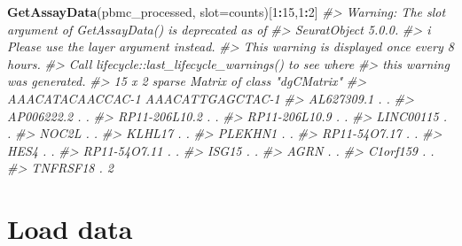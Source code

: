 \documentclass[
]{book}
\newenvironment{Shaded}{\begin{snugshade}}{\end{snugshade}}
\newcommand{\AttributeTok}[1]{\textcolor[rgb]{0.13,0.29,0.53}{#1}}
\newcommand{\CommentTok}[1]{\textcolor[rgb]{0.56,0.35,0.01}{\textit{#1}}}
\newcommand{\DecValTok}[1]{\textcolor[rgb]{0.00,0.00,0.81}{#1}}
\newcommand{\FunctionTok}[1]{\textcolor[rgb]{0.13,0.29,0.53}{\textbf{#1}}}
\newcommand{\NormalTok}[1]{#1}
\newcommand{\SpecialCharTok}[1]{\textcolor[rgb]{0.81,0.36,0.00}{\textbf{#1}}}
\newcommand{\StringTok}[1]{\textcolor[rgb]{0.31,0.60,0.02}{#1}}
\begin{document}
\begin{Shaded}
\begin{Highlighting}[]
\FunctionTok{GetAssayData}\NormalTok{(pbmc\_processed, }\AttributeTok{slot=}\StringTok{\textquotesingle{}counts\textquotesingle{}}\NormalTok{)[}\DecValTok{1}\SpecialCharTok{:}\DecValTok{15}\NormalTok{,}\DecValTok{1}\SpecialCharTok{:}\DecValTok{2}\NormalTok{]}
\CommentTok{\#\textgreater{} Warning: The \textasciigrave{}slot\textasciigrave{} argument of \textasciigrave{}GetAssayData()\textasciigrave{} is deprecated as of}
\CommentTok{\#\textgreater{} SeuratObject 5.0.0.}
\CommentTok{\#\textgreater{} i Please use the \textasciigrave{}layer\textasciigrave{} argument instead.}
\CommentTok{\#\textgreater{} This warning is displayed once every 8 hours.}
\CommentTok{\#\textgreater{} Call \textasciigrave{}lifecycle::last\_lifecycle\_warnings()\textasciigrave{} to see where}
\CommentTok{\#\textgreater{} this warning was generated.}
\CommentTok{\#\textgreater{} 15 x 2 sparse Matrix of class "dgCMatrix"}
\CommentTok{\#\textgreater{}               AAACATACAACCAC{-}1 AAACATTGAGCTAC{-}1}
\CommentTok{\#\textgreater{} AL627309.1                   .                .}
\CommentTok{\#\textgreater{} AP006222.2                   .                .}
\CommentTok{\#\textgreater{} RP11{-}206L10.2                .                .}
\CommentTok{\#\textgreater{} RP11{-}206L10.9                .                .}
\CommentTok{\#\textgreater{} LINC00115                    .                .}
\CommentTok{\#\textgreater{} NOC2L                        .                .}
\CommentTok{\#\textgreater{} KLHL17                       .                .}
\CommentTok{\#\textgreater{} PLEKHN1                      .                .}
\CommentTok{\#\textgreater{} RP11{-}54O7.17                 .                .}
\CommentTok{\#\textgreater{} HES4                         .                .}
\CommentTok{\#\textgreater{} RP11{-}54O7.11                 .                .}
\CommentTok{\#\textgreater{} ISG15                        .                .}
\CommentTok{\#\textgreater{} AGRN                         .                .}
\CommentTok{\#\textgreater{} C1orf159                     .                .}
\CommentTok{\#\textgreater{} TNFRSF18                     .                2}
\end{Highlighting}
\end{Shaded}

\hypertarget{load}{%
\chapter{Load data}\label{load}}
\end{document}
